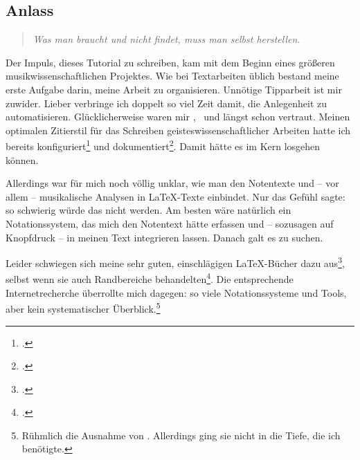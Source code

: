 %
%
%



\subsection{Anlass}

\begin{quote}\textit{Was man braucht und nicht findet, muss man selbst herstellen.}
\end{quote}

Der Impuls, dieses Tutorial zu schreiben, kam mit dem Beginn eines größeren
musikwissenschaftlichen Projektes. Wie bei Textarbeiten üblich bestand meine
erste Aufgabe darin, meine Arbeit zu organisieren. Unnötige Tipparbeit ist mir
zuwider. Lieber verbringe ich doppelt so viel Zeit damit, die Anlegenheit zu
automatisieren. Glücklicherweise waren mir \acc{\LaTeX}, \ und
 längst schon vertraut. Meinen optimalen Zitierstil für das
Schreiben geisteswissenschaftlicher Arbeiten hatte ich bereits
konfiguriert\footcite[vgl.][\nopage wp]{Reincke2018a} und
dokumentiert\footcite[vgl][2ff]{Reincke2018b}. Damit hätte es im Kern losgehen
können.

Allerdings war für mich noch völlig unklar, wie man den Notentexte und -- vor
allem -- musikalische Analysen in \LaTeX-Texte einbindet. Nur das Gefühl sagte:
so schwierig würde das nicht werden. Am besten wäre natürlich ein
No\-ta\-tions\-system, das mich den Notentext hätte erfassen und -- sozusagen auf
Knopfdruck -- in meinen Text integrieren lassen. Danach galt es zu suchen.

Leider schwiegen sich meine sehr guten, einschlägigen \LaTeX-Bücher dazu
aus\footcite[ vgl.][vi ff, insbesondere 905 u. 909: das umfangreiche Register
erwähnt weder Musik im allgemeinen noch LilyPond oder MusiX\TeX im
Besonderen]{Voss2012a}, selbst wenn sie auch Randbereiche
behandelten\footcite[vgl.][vii ff, insbesondere 1080 u.
1087: auch dieses umfangreiche Register erwähnt weder Musik im allgemeinen noch
LilyPond oder MusiX\TeX im Besonderen.]{MitGoo2005a}. Die entsprechende
Internetrecherche überrollte mich dagegen: so viele Notationssysteme und Tools,
aber kein systematischer Überblick.\footnote{Rühmlich die Ausnahme von
\cite[][\nopage wp]{Thoma2018a}. Allerdings ging sie nicht in die Tiefe, die ich
benötigte.}

